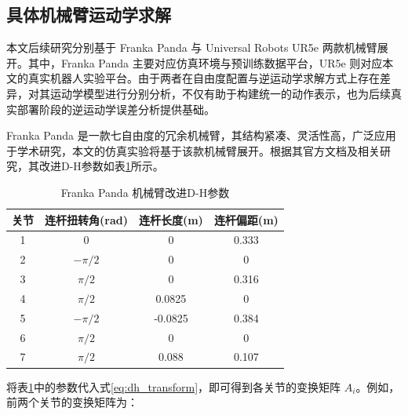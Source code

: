 \subsection{具体机械臂运动学求解}
\label{subsec:specific_robot_kinematics}

本文后续研究分别基于 Franka Panda 与 Universal Robots UR5e 两款机械臂展开。其中，Franka Panda 主要对应仿真环境与预训练数据平台，UR5e 则对应本文的真实机器人实验平台。由于两者在自由度配置与逆运动学求解方式上存在差异，对其运动学模型进行分别分析，不仅有助于构建统一的动作表示，也为后续真实部署阶段的逆运动学误差分析提供基础。

Franka Panda 是一款七自由度的冗余机械臂，其结构紧凑、灵活性高，广泛应用于学术研究，本文的仿真实验将基于该款机械臂展开。根据其官方文档及相关研究，其改进D-H参数如表\ref{tab:panda_dh_parameters}所示。

\begin{table}[H]
  \centering
  \caption{Franka Panda 机械臂改进D-H参数}
  \label{tab:panda_dh_parameters}
  \begin{tabular}{cccc}
    \toprule
    关节 & 连杆扭转角(rad) & 连杆长度(m) & 连杆偏距(m)  \\
    \midrule
    1 & 0 & 0 & 0.333 \\
    2 & $-\pi/2$ & 0 & 0 \\
    3 & $\pi/2$ & 0 & 0.316 \\
    4 & $\pi/2$ & 0.0825 & 0 \\
    5 & $-\pi/2$ & -0.0825 & 0.384 \\
    6 & $\pi/2$ & 0 & 0 \\
    7 & $\pi/2$ & 0.088 & 0.107 \\
    \bottomrule
  \end{tabular}
\end{table}

将表\ref{tab:panda_dh_parameters}中的参数代入式\ref{eq:dh_transform}，即可得到各关节的变换矩阵 $A_i$。例如，前两个关节的变换矩阵为：

